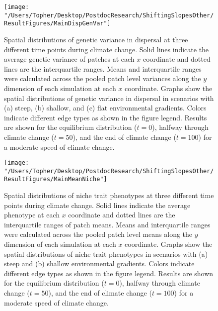 \documentclass[11pt]{article}
\begin{document}
\clearpage
\begin{figure}[h!]
\texttt{[image: "/Users/Topher/Desktop/PostdocResearch/ShiftingSlopesOther/ResultFigures/MainDispGenVar"]}
\caption{Spatial distributions of genetic variance in dispersal at three different time points during climate change. Solid lines indicate the average genetic variance of patches at each $x$ coordinate and dotted lines are the interquartile ranges. Means and interquartile ranges were calculated across the pooled patch level variances along the $y$ dimension of each simulation at each $x$ coordinate. Graphs show the spatial distributions of genetic variance in dispersal in scenarios with (a) steep, (b) shallow, and (c) flat environmental gradients. Colors indicate different edge types as shown in the figure legend. Results are shown for the equilibrium distribution ($t = 0$), halfway through climate change ($t = 50$), and the end of climate change ($t = 100$) for a moderate speed of climate change.}
\label{fig:DispGenVar}
\end{figure}

\clearpage

\begin{figure}[h!]
\texttt{[image: "/Users/Topher/Desktop/PostdocResearch/ShiftingSlopesOther/ResultFigures/MainMeanNiche"]}
\caption{Spatial distributions of niche trait phenotypes at three different time points during climate change. Solid lines indicate the average phenotype at each $x$ coordinate and dotted lines are the interquartile ranges of patch means. Means and interquartile ranges were calculated across the pooled patch level means along the $y$ dimension of each simulation at each $x$ coordinate. Graphs show the spatial distributions of niche trait phenotypes in scenarios with (a) steep and (b) shallow environmental gradients. Colors indicate different edge types as shown in the figure legend. Results are shown for the equilibrium distribution ($t = 0$), halfway through climate change ($t = 50$), and the end of climate change ($t = 100$) for a moderate speed of climate change.}
\label{fig:MeanNiche}
\end{figure}

\clearpage
\end{document}

